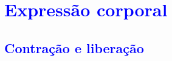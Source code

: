 




\chapter{\textcolor{blue}{ Expressão corporal}}



\section{\textcolor{blue}{ Contração e liberação}}

